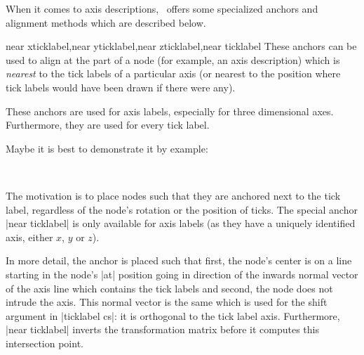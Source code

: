When it comes to axis descriptions, \PGFPlots\ offers some specialized anchors and alignment methods which are described below.
\begin{anchorlist}{near xticklabel,near yticklabel,near zticklabel,near ticklabel}
	These anchors can be used to align at the part of a node (for example, an axis description) which is \emph{nearest} to the tick labels of a particular axis (or nearest to the position where tick labels would have been drawn if there were any).

	These anchors are used for axis labels, especially for three dimensional axes. Furthermore, they are used for every tick label.

\label{key:near:ticklabel}
	Maybe it is best to demonstrate it by example:
\begin{codeexample}[]
%
~
\end{codeexample}

	The motivation is to place nodes such that they are anchored next to the tick label, regardless of the node's rotation or the position of ticks. The special anchor |near ticklabel| is only available for axis labels (as they have a uniquely identified axis, either $x$, $y$ or $z$).

	In more detail, the anchor is placed such that first, the node's center is on a line starting in the node's |at| position going in direction of the inwards normal vector of the axis line which contains the tick labels and second, the node does not intrude the axis. This normal vector is the same which is used for the shift argument in |ticklabel cs|: it is orthogonal to the tick label axis. Furthermore, |near ticklabel| inverts the transformation matrix before it computes this intersection point.


\end{anchorlist}
